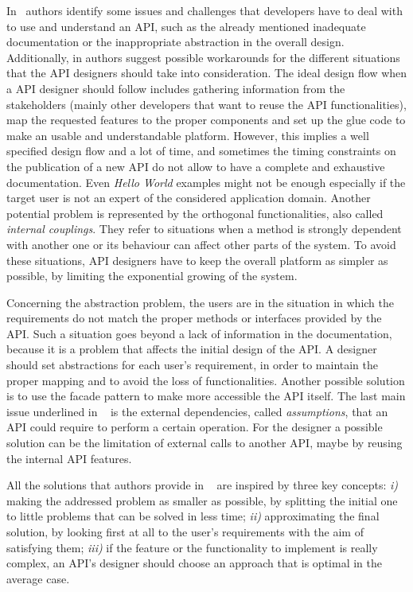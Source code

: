 \smallskip
In~\cite{by_christopher_scaffidi_why_2006} authors identify some 
issues and challenges that developers have to deal with to use and understand 
an API, such as the already mentioned inadequate documentation or the 
inappropriate abstraction in the overall design. Additionally, in 
\cite{by_christopher_scaffidi_why_2006} authors suggest possible workarounds 
for the different situations that the API designers should take into 
consideration. The ideal design flow when a API designer should 
follow includes gathering information from the stakeholders (mainly 
other developers that want to reuse the API functionalities), map the 
requested features to the proper components and set up the glue code to make an 
usable and understandable platform. However, this implies a well specified 
design flow and a lot of time, and sometimes the timing constraints on the 
publication of a new API do not allow to have a complete and exhaustive 
documentation. Even \textit{Hello World} examples might not be enough 
especially if the target user is not an expert of the considered application  
domain. Another potential problem is represented by the orthogonal 
functionalities, also called \textit{internal couplings}. They refer to 
situations when a method is strongly dependent with another one or its 
behaviour can affect other parts of the system. To avoid these situations,  API 
designers have to keep the overall platform as simpler as possible, by limiting 
the exponential growing of the system. 

Concerning the abstraction problem, the users are in the situation in which the 
requirements do not match the proper methods or interfaces provided by the API. 
Such a situation goes beyond a lack of information in the documentation, 
because it is a problem that affects the initial design of the API. A designer 
should set abstractions for each user's requirement, in order to maintain the 
proper mapping and to avoid the loss of functionalities. Another possible 
solution is to use the facade pattern to make more accessible the API itself. 
The last main issue underlined in ~\cite{by_christopher_scaffidi_why_2006}  is 
the external dependencies, called \textit{assumptions}, that an API could 
require to perform a certain operation. For the designer a possible solution 
can be the limitation of external calls to another API, maybe by reusing the 
internal API features. 


All the solutions that authors provide in 
~\cite{by_christopher_scaffidi_why_2006} are inspired by three key concepts: 
\textit{i)} making the addressed problem as smaller as possible, by splitting 
the initial one to little problems that can be solved in less time; 
\textit{ii)} approximating the final solution, by looking first at all to the 
user's requirements with the aim of satisfying them; \textit{iii)} if the 
feature or the functionality to implement is really complex, an API's designer 
should choose an approach that is optimal in the average case. 

